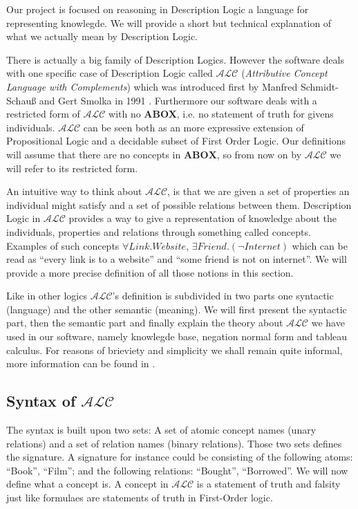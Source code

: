 Our project is focused on reasoning in Description Logic a language
for representing knowlegde. We will provide a short but technical
explanation of what we actually mean by Description Logic. 

There is actually a big family of Description Logics. However the
software deals with one specific case of Description Logic called
$\mathcal{ALC}$ (\textit{Attributive Concept Language with
Complements}) which was introduced first by Manfred Schmidt-Schau\ss
and Gert Smolka in 1991 \cite{msgs}. Furthermore our software deals
with a restricted form of $\mathcal{ALC}$ with no \textbf{ABOX},
i.e. no statement of truth for givens individuals. $\mathcal{ALC}$ can
be seen both as an more expressive extension of Propositional Logic
and a decidable subset of First Order Logic. Our definitions will
assume that there are no concepts in $\textbf{ABOX}$, so from now on by
$\mathcal{ALC}$ we will refer to its restricted form.

An intuitive way to think about $\mathcal{ALC}$, is that we are given
a set of properties an individual might satisfy and a set of possible
relations between them. Description Logic in $\mathcal{ALC}$ provides
a way to give a representation of knowledge about the individuals,
properties and relations through something called concepts. Examples
of such concepts $\forall Link . Website$, $\exists Friend . (\neg
Internet)$ which can be read as ``every link is to a website'' and
``some friend is not on internet''. We will provide a more precise
definition of all those notions in this section.

Like in other logics $\mathcal{ALC}$'s definition is subdivided in two
parts one syntactic (language) and the other semantic (meaning). We
will first present the syntactic part, then the semantic part and
finally explain the theory about $\mathcal{ALC}$ we have used in our
software, namely knowlegde base, negation normal form and tableau
calculus. For reasons of brieviety and simplicity we shall remain
quite informal, more information can be found in \cite{msgs}.

\subsection{Syntax of $\mathcal{ALC}$}

The syntax is built upon two sets: A set of atomic concept names
(unary relations) and a set of relation names (binary
relations). Those two sets defines the signature. A signature for
instance could be consisting of the following atoms: ``Book'',
``Film''; and the following relations: ``Bought'', ``Borrowed''. We
will now define what a concept is. A concept in $\mathcal{ALC}$ is a
statement of truth and falsity just like formulaes are statements of
truth in First-Order logic.

